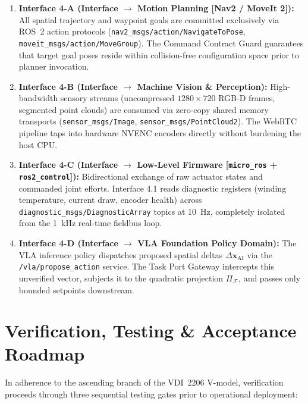 \documentclass[10pt,a4paper]{article}
\begin{document}
\begin{enumerate}[leftmargin=1.5em]
    \item \textbf{Interface 4-A (Interface $\to$ Motion Planning [Nav2 / MoveIt 2]):}
    All spatial trajectory and waypoint goals are committed exclusively via ROS~2 action protocols (\texttt{nav2\_msgs/action/NavigateToPose}, \texttt{moveit\_msgs/action/MoveGroup}). The Command Contract Guard guarantees that target goal poses reside within collision-free configuration space prior to planner invocation.
    
    \item \textbf{Interface 4-B (Interface $\to$ Machine Vision \& Perception):}
    High-bandwidth sensory streams (uncompressed $1280\times720$ RGB-D frames, segmented point clouds) are consumed via zero-copy shared memory transports (\texttt{sensor\_msgs/Image}, \texttt{sensor\_msgs/PointCloud2}). The WebRTC pipeline taps into hardware NVENC encoders directly without burdening the host CPU.

    \item \textbf{Interface 4-C (Interface $\to$ Low-Level Firmware [\texttt{micro\_ros} + \texttt{ros2\_control}]):}
    Bidirectional exchange of raw actuator states and commanded joint efforts. Interface 4.1 reads diagnostic registers (winding temperature, current draw, encoder health) across \texttt{diagnostic\_msgs/DiagnosticArray} topics at 10~Hz, completely isolated from the 1~kHz real-time fieldbus loop.

    \item \textbf{Interface 4-D (Interface $\to$ VLA Foundation Policy Domain):}
    The VLA inference policy dispatches proposed spatial deltas $\Delta\mathbf{x}_{\text{AI}}$ via the \texttt{/vla/propose\_action} service. The Task Port Gateway intercepts this unverified vector, subjects it to the quadratic projection $\Pi_{\mathcal{F}}$, and passes only bounded setpoints downstream.
\end{enumerate}

\section{Verification, Testing \& Acceptance Roadmap}
\label{sec:verification}

In adherence to the ascending branch of the VDI~2206 V-model, verification proceeds through three sequential testing gates prior to operational deployment:
\end{document}
